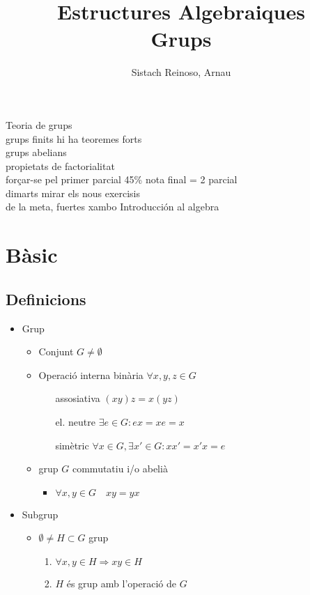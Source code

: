 \documentclass{article}
\title{Estructures Algebraiques\\Grups}
\author{Sistach Reinoso, Arnau}
\begin{document}
\maketitle
Teoria de grups\\
grups finits hi ha teoremes forts\\
grups abelians\\
propietats de factorialitat\\
forçar-se pel primer parcial 45\% nota final = 2 parcial\\
dimarts mirar els nous exercisis\\
de la meta, fuertes xambo Introducción al algebra\\
\newpage

\section{Bàsic}
\subsection{Definicions}
\begin{itemize}
\item Grup
	\begin{itemize}
	\item Conjunt $G \neq \emptyset$
	\item Operació interna binària $\forall x, y, z \in G$
		\begin{enumerate}
		\item[assosiativa] $(xy)z = x(yz) $
		\item[el. neutre] $\exists e \in G: ex = xe = x$
		\item[simètric] $\forall x \in G, \exists x' \in G: xx' = x'x = e$
		\end{enumerate}
	\item grup $G$ commutatiu i/o abelià
		\begin{itemize}
		\item $\forall x, y \in G\quad xy = yx$
		\end{itemize}
	\end{itemize}
\item Subgrup
	\begin{itemize}
	\item $\emptyset \neq H \subset G$ grup
		\begin{enumerate}
		\item $\forall x, y \in H \Rightarrow xy \in H$
		\item $H$ és grup amb l'operació de $G$
		\end{enumerate}
	\end{itemize}
\end{itemize}
\end{document}
